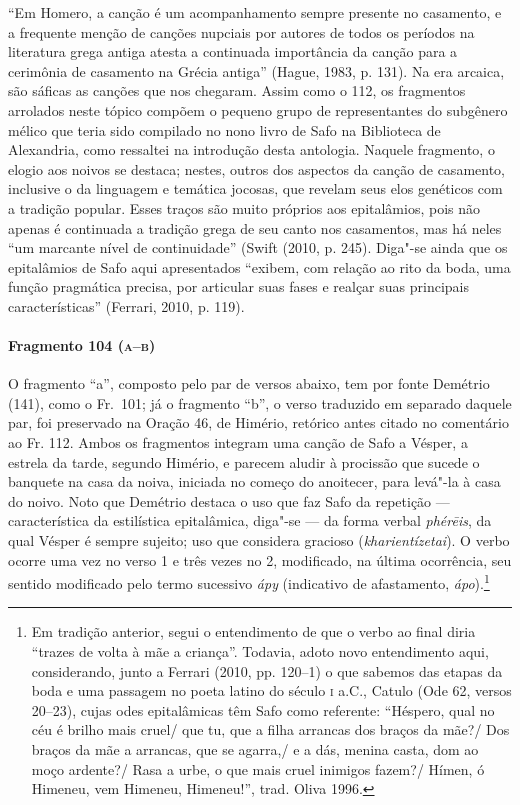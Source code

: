 {``Em Homero, a canção é um acompanhamento sempre presente no casamento, e a frequente menção de canções nupciais por autores de todos os períodos na literatura grega antiga atesta a continuada importância da canção para a cerimônia de casamento na Grécia antiga” (Hague, 1983, p. 131). Na era arcaica, são sáficas as canções que nos chegaram. Assim como o 112, os fragmentos arrolados neste tópico compõem o pequeno grupo
de representantes do subgênero mélico que teria sido compilado no nono livro de
Safo na Biblioteca de Alexandria, como ressaltei na introdução desta antologia.
Naquele fragmento, o elogio aos noivos se destaca; nestes, outros dos aspectos
da canção de casamento, inclusive o da linguagem e temática jocosas, que
revelam seus elos genéticos com a tradição popular.
Esses traços são muito próprios aos epitalâmios, pois não apenas é continuada a tradição grega de seu canto nos casamentos, mas há neles  “um marcante nível de continuidade” (Swift (2010, p. 245). Diga"-se ainda que os epitalâmios de Safo aqui apresentados “exibem, com relação ao rito da boda, uma função pragmática precisa, por articular suas fases e realçar suas principais características” (Ferrari, 2010, p. 119). 

\paragraph{Fragmento 104 (\textsc{a--b})}

{\small O fragmento “a”, composto pelo par de versos abaixo, tem por fonte Demétrio (141),
como o Fr.~101; já o fragmento “b”, o verso traduzido em separado daquele par,
foi preservado na Oração 46, de Himério, retórico antes citado no comentário ao Fr. 112.
Ambos os fragmentos integram uma canção de Safo a Vésper, a estrela da tarde,
segundo Himério, e parecem aludir à procissão que sucede o banquete na casa da
noiva, iniciada no começo do anoitecer, para levá"-la à casa do noivo.
Noto que Demétrio destaca o uso que faz Safo da repetição --- característica da estilística epitalâmica, diga"-se --- da forma verbal \textit{phérēis}, da qual Vésper é sempre sujeito; uso que considera gracioso (\textit{kharientízetai}). O verbo ocorre uma vez no verso 1 e três vezes no 2, modificado, na última ocorrência, seu sentido modificado pelo termo sucessivo \textit{ápy} (indicativo de afastamento, \textit{ápo}).\footnote{Em tradição anterior, segui o entendimento de que o verbo ao final diria ``trazes de volta à mãe a criança''. Todavia, adoto novo entendimento aqui, considerando, junto a Ferrari (2010, pp. 120--1) o que sabemos das etapas da boda e uma passagem no poeta latino do século \textsc{i} a.C., Catulo (Ode 62, versos 20--23), cujas odes epitalâmicas têm Safo como referente: ``Héspero, qual no céu é brilho mais cruel/ que tu, que a filha arrancas dos braços da mãe?/ Dos braços da mãe a arrancas, que se agarra,/ e a dás, menina casta, dom ao moço ardente?/ Rasa a urbe, o que mais cruel inimigos fazem?/ Hímen, ó Himeneu, vem Himeneu, Himeneu!'', trad. Oliva 1996.} }

}
